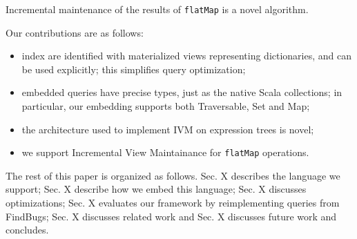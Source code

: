 \documentclass[preprint,authoryear,10pt]{sigplanconf}
\begin{document}
Incremental maintenance of the results of \texttt{flatMap} is a novel
algorithm.

Our contributions are as follows:

\begin{itemize}
\item
  index are identified with materialized views representing
  dictionaries, and can be used explicitly; this simplifies query
  optimization;
\item
  embedded queries have precise types, just as the native Scala
  collections; in particular, our embedding supports both Traversable,
  Set and Map;
\item
  the architecture used to implement IVM on expression trees is novel;
\item
  we support Incremental View Maintainance for \texttt{flatMap}
  operations.
\end{itemize}
The rest of this paper is organized as follows. Sec. X describes the
language we support; Sec. X describe how we embed this language; Sec. X
discusses optimizations; Sec. X evaluates our framework by
reimplementing queries from FindBugs; Sec. X discusses related work and
Sec. X discusses future work and concludes.
\end{document}
